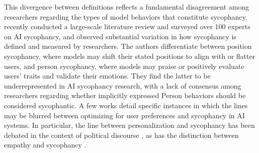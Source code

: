 This divergence between definitions reflects a fundamental disagreement among researchers regarding the types of model behaviors that constitute sycophancy. \citet{ye2026countsaisycophancytaxonomy} recently conducted a large-scale literature review and surveyed over 100 experts on AI sycophancy, and observed substantial variation in how sycophancy is defined and measured by researchers. The authors differentiate between position sycophancy, where models may shift their stated positions to align with or flatter users, and person sycophancy, where models may praise or positively evaluate users' traits and validate their emotions. They find the latter to be underrepresented in AI sycophancy research, with a lack of consensus among researchers regarding whether implicitly expressed Person behaviors should be considered sycophantic. A few works detail specific instances in which the lines may be blurred between optimizing for user preferences and sycophancy in AI systems. In particular, the line between personalization and sycophancy has been debated in the context of political discourse \cite{batzner2025germanpartiesqa}, as has the distinction between empathy and sycophancy \cite{PDFAIEmp14:online}. 

